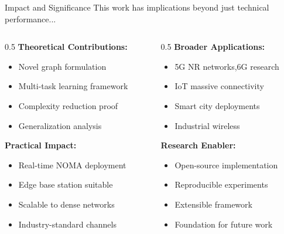 \documentclass[aspectratio=169]{beamer}
\begin{document}
\begin{frame}{Impact and Significance}
    \vspace{-0.2cm}
    \small \textcolor{iiitblue}{This work has implications beyond just technical performance...}
    
    \begin{columns}
        \begin{column}{0.5\textwidth}
            \textbf{Theoretical Contributions:}
            \begin{itemize}
                \item Novel graph formulation
                \item Multi-task learning framework
                \item Complexity reduction proof
                \item Generalization analysis
            \end{itemize}
            
        
            
            \textbf{Practical Impact:}
            \begin{itemize}
                \item Real-time NOMA deployment
                \item Edge base station suitable
                \item Scalable to dense networks
                \item Industry-standard channels
            \end{itemize}
        \end{column}
         \vspace{-1cm}
        \begin{column}{0.5\textwidth}
            \textbf{Broader Applications:}
            \begin{itemize}
                \item 5G NR networks,6G research
                \item IoT massive connectivity
                \item Smart city deployments
                \item Industrial wireless
            \end{itemize}
            
            \vspace{-.3cm}
            
            \textbf{Research Enabler:}
            \begin{itemize}
                \item Open-source implementation
                \item Reproducible experiments
                \item Extensible framework
                \item Foundation for future work
            \end{itemize}
        \end{column}
    \end{columns}
    

\end{frame}
\end{document}
